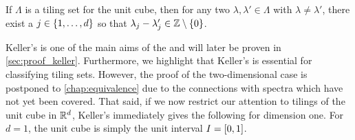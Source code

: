 \documentclass[../thesis.tex]{subfiles}
\begin{document}
\begin{theorem}\label{thrm:keller_tiling}
    If $\Lambda$ is a tiling set for the unit cube, then for any two $\lambda, \lambda' \in \Lambda$ with $\lambda\neq\lambda'$, there exist a $j\in \{1,\dots,d\}$ so that $\lambda_j-\lambda_j' \in \mathbb{Z}\setminus\{0\}$.
\end{theorem}

Keller's  is one of the main aims of the  and will later be proven in \cref{sec:proof_keller}. Furthermore, we highlight that Keller's  is essential for classifying tiling sets. However, the proof of the two-dimensional case is postponed to \cref{chap:equivalence} due to the connections with spectra which have not yet been covered.
That said, if we now restrict our attention to tilings of the unit cube in $\mathbb{R}^d$, Keller's  immediately gives the following for dimension one. For $d=1$, the unit cube is simply the unit interval $I = [0,1]$. %
\end{document}

